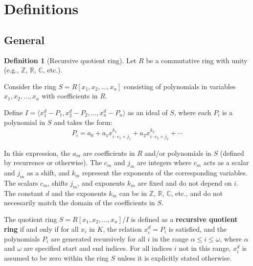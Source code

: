 \documentclass{article}
\theoremstyle{plain}
\theoremstyle{definition}
\newtheorem{definition}{Definition}
\newcommand{\Z}{\mathbb{Z}}
\begin{document}
\section{Definitions}
\subsection{General}

\begin{definition}[Recursive quotient ring] \label{definition:recursivering}
Let \( R \) be a commutative ring with unity (e.g., \(\Z\), \(\mathbb{R}\), \(\mathbb{C}\), etc.).

Consider the ring \( S = R[x_1, x_2, \ldots, x_{n} ] \) consisting of polynomials in variables \( x_1, x_2, \ldots, x_n \) with coefficients in \( R \).

Define \( I = \langle x_1^d - P_1, x_2^d - P_2, \ldots, x_n^d - P_n \rangle \) as an ideal of \( S \), where each \( P_i \) is a polynomial in \( S \) and takes the form:
\begin{align}
    P_i = a_0 + a_1 x_{i \cdot c_1 + j_1}^{k_1} + a_2 x_{i \cdot c_2 + j_2}^{k_2} + \cdots
\end{align}

In this expression, the \( a_m \) are coefficients in \( R \) and/or polynomials in \( S \) (defined by recurrence or otherwise). The \( c_m \) and \( j_m \) are integers where \( c_m \) acts as a scalar and \( j_m \) as a shift, and \( k_m \) represent the exponents of the corresponding variables. The scalars \( c_m \), shifts \( j_m \), and exponents \( k_m \) are fixed and do not depend on \( i \). The constant \( d \) and the exponents \( k_m \) can be in \(\Z\), \(\mathbb{R}\), \(\mathbb{C}\), etc., and do not necessarily match the domain of the coefficients in \( S \).

The quotient ring \( S = R[x_1, x_2, \ldots, x_{n}]/I \) is defined as a \textbf{recursive quotient ring} if and only if for all \( x_i \) in \( K \), the relation \( x_i^d = P_i \) is satisfied, and the polynomials \( P_i \) are generated recursively for all \( i \) in the range \( \alpha \leq i \leq \omega \), where \( \alpha \) and \( \omega \) are specified start and end indices. For all indices \( i \) not in this range, \( x_i^d \) is assumed to be zero within the ring \( S \) unless it is explicitly stated otherwise.
\end{definition}
\end{document}
